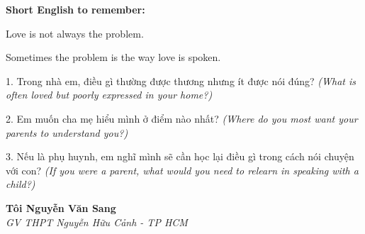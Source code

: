\begin{ghinhoanh}
\textbf{Short English to remember:}

Love is not always the problem.

Sometimes the problem is the way love is spoken.
\end{ghinhoanh}

\begin{tuhocnhanh}
1. Trong nhà em, điều gì thường được thương nhưng ít được nói đúng? \textit{(What is often loved but poorly expressed in your home?)}

2. Em muốn cha mẹ hiểu mình ở điểm nào nhất? \textit{(Where do you most want your parents to understand you?)}

3. Nếu là phụ huynh, em nghĩ mình sẽ cần học lại điều gì trong cách nói chuyện với con? \textit{(If you were a parent, what would you need to relearn in speaking with a child?)}
\end{tuhocnhanh}

\begin{flushright}
\textbf{Tôi Nguyễn Văn Sang}\\
\textit{GV THPT Nguyễn Hữu Cảnh - TP HCM}
\end{flushright}

\ngancach
